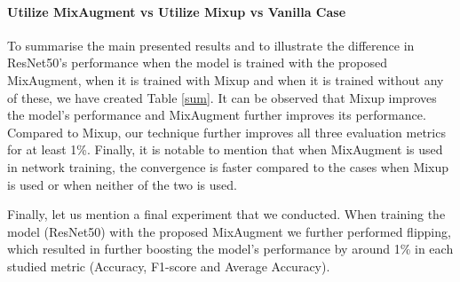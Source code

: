 \documentclass[10pt,twocolumn,letterpaper]{article}
\begin{document}
\paragraph{Utilize MixAugment vs Utilize Mixup vs Vanilla Case}  To summarise the main presented results and to illustrate the difference in ResNet50's performance when the model is trained with the proposed MixAugment, when it is trained with Mixup and when it is trained without any of these, we have created Table \ref{sum}. It can be observed that Mixup improves the model's performance and MixAugment further improves its performance. Compared to Mixup, our technique further improves all three evaluation metrics for at least 1\%. Finally, it is notable to mention that when MixAugment is used in network training, the convergence is faster compared to the cases when Mixup is used or when neither of the two is used. 




\begin{table}[h!]
\setlength{\tabcolsep}{8pt}
\caption{ResNet50 trained with MixAugment, with Mixup and without any of the two}
\label{sum}
\centering
{}
\end{table} 


Finally, let us mention a final experiment that we conducted. When training the model (ResNet50) with the proposed MixAugment we further performed flipping, which resulted in further boosting the model's performance by around 1\% in each studied metric (Accuracy, F1-score and Average Accuracy).
 
\end{document}
